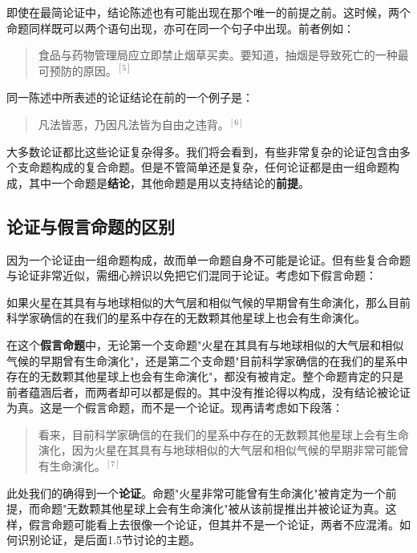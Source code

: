 即使在最简论证中，结论陈述也有可能出现在那个唯一的前提之前。这时候，两个命题同样既可以两个语句出现，亦可在同一个句子中出现。前者例如：

\begin{quotation}
食品与药物管理局应立即禁止烟草买卖。要知道，抽烟是导致死亡的一种最可预防的原因。${}^{[5]}$
\end{quotation}

同一陈述中所表述的论证结论在前的一个例子是：

\begin{quotation}
凡法皆恶，乃因凡法皆为自由之违背。${}^{[6]}$
\end{quotation}

大多数论证都比这些论证复杂得多。我们将会看到，有些非常复杂的论证包含由多个支命题构成的复合命题。但是不管简单还是复杂，任何论证都是由一组命题构成，其中一个命题是\textbf{结论}，其他命题是用以支持结论的\textbf{前提}。

\subsection{论证与假言命题的区别}

因为一个论证由一组命题构成，故而单一命题自身不可能是论证。但有些复合命题与论证非常近似，需细心辨识以免把它们混同于论证。考虑如下假言命题：

\begin{displayquote}
如果火星在其具有与地球相似的大气层和相似气候的早期曾有生命演化，那么目前科学家确信的在我们的星系中存在的无数颗其他星球上也会有生命演化。
\end{displayquote}

在这个\textbf{假言命题}中，无论第一个支命题"火星在其具有与地球相似的大气层和相似气候的早期曾有生命演化"，还是第二个支命题"目前科学家确信的在我们的星系中存在的无数颗其他星球上也会有生命演化"，都没有被肯定。整个命题肯定的只是前者蕴涵后者，而两者却可以都是假的。其中没有推论得以构成，没有结论被论证为真。这是一个假言命题，而不是一个论证。现再请考虑如下段落：

\begin{quotation}
看来，目前科学家确信的在我们的星系中存在的无数颗其他星球上会有生命演化，因为火星在其具有与地球相似的大气层和相似气候的早期非常可能曾有生命演化。${}^{[7]}$
\end{quotation}

此处我们的确得到一个\textbf{论证}。命题"火星非常可能曾有生命演化"被肯定为一个前提，而命题"无数颗其他星球上会有生命演化"被从该前提推出并被论证为真。这样，假言命题可能看上去很像一个论证，但其并不是一个论证，两者不应混淆。如何识别论证，是后面1.5节讨论的主题。

